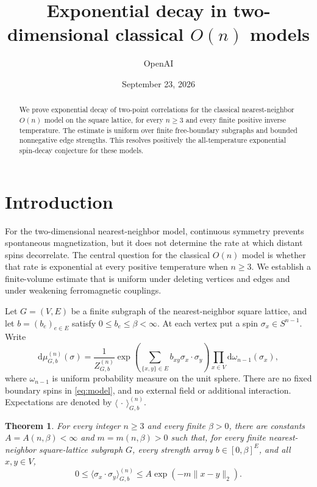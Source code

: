 \documentclass[11pt]{article}
\title{Exponential decay in two-dimensional classical $O(n)$ models}
\author{OpenAI}
\date{September 23, 2026}
\newtheorem{theorem}{Theorem}[section]
\theoremstyle{definition}
\theoremstyle{remark}
\newcommand{\dd}{\mathrm d}
\numberwithin{equation}{section}
\begin{document}
\maketitle
\begin{abstract}
We prove exponential decay of two-point correlations for the classical
nearest-neighbor $O(n)$ model on the square lattice, for every $n\ge3$
and every finite positive inverse temperature. The estimate is uniform over
finite free-boundary subgraphs and bounded nonnegative edge strengths. This
resolves positively the all-temperature exponential spin-decay conjecture
for these models.
\end{abstract}

\section{Introduction}
\label{sec:introduction}

For the two-dimensional nearest-neighbor model, continuous symmetry
prevents spontaneous magnetization,
but it does not determine the rate at which distant spins decorrelate.
The central question for the classical $O(n)$ model is whether that
rate is exponential at every positive temperature when $n\ge3$.
We establish a finite-volume estimate that is uniform under deleting
vertices and edges and under weakening ferromagnetic couplings.

Let $G=(V,E)$ be a finite subgraph of the nearest-neighbor square lattice,
and let $b=(b_e)_{e\in E}$ satisfy $0\le b_e\le\beta<\infty$.
At each vertex put a spin $\sigma_x\in S^{n-1}$. Write
\begin{equation}
 \dd\mu_{G,b}^{(n)}(\sigma)
 =\frac{1}{Z_{G,b}^{(n)}}
   \exp\!\left(\sum_{\{x,y\}\in E}b_{xy}\sigma_x\cdot\sigma_y\right)
   \prod_{x\in V}\dd\omega_{n-1}(\sigma_x),
 \label{eq:model}
\end{equation}
where $\omega_{n-1}$ is uniform probability measure on the unit sphere.
There are no fixed boundary spins in \eqref{eq:model}, and no external
field or additional interaction. Expectations are denoted by
$\langle\,\cdot\,\rangle_{G,b}^{(n)}$.

\begin{theorem}
\label{thm:main}
For every integer $n\ge3$ and every finite $\beta>0$, there are constants
$A=A(n,\beta)<\infty$ and $m=m(n,\beta)>0$ such that, for every finite
nearest-neighbor square-lattice subgraph $G$, every strength array
$b\in[0,\beta]^E$, and all $x,y\in V$,
\begin{equation}
 0\le \langle\sigma_x\cdot\sigma_y\rangle_{G,b}^{(n)}
 \le A\exp(-m\|x-y\|_2).
 \label{eq:main-bound}
\end{equation}
\end{theorem}
\end{document}
